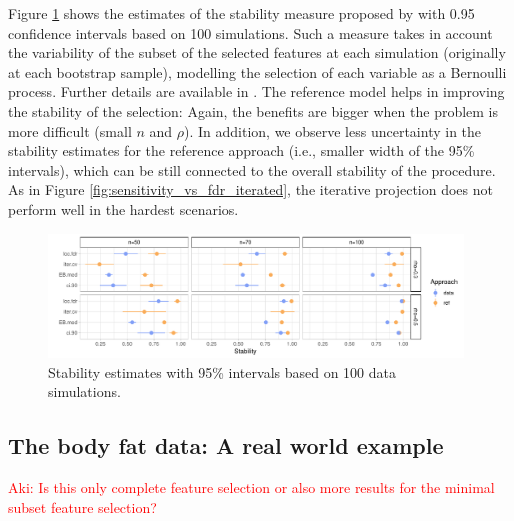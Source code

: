 \documentclass[american,]{article}
\theoremstyle{definition}
\newcommand{\note}[1]{\textcolor{red}{#1}}
\begin{document}

Figure \ref{fig:stability_iterated} shows the estimates of the stability
measure proposed by \cite{paper:stability} with 0.95 confidence
intervals based on 100 simulations. Such a measure takes in account
the variability of the subset of the selected features at each
simulation (originally at each bootstrap sample), modelling the
selection of each variable as a Bernoulli process. Further details are
available in \cite{paper:stability}. The reference model helps in
improving the stability of the selection: Again, the benefits are
bigger when the problem is more difficult (small $n$ and $\rho$). In
addition, we observe less uncertainty in the stability estimates for
the reference approach (i.e., smaller width of the 95\% intervals),
which can be still connected to the overall stability of the
procedure. As in Figure \ref{fig:sensitivity_vs_fdr_iterated}, the iterative
projection does not perform well in the hardest scenarios. 

\begin{figure}[tp]
  \centering
  \includegraphics[width=0.98\textwidth]{graphics/stability_iterated.pdf}
  \caption{Stability estimates with 95\% intervals based on 100 data simulations.\\}
  \label{fig:stability_iterated}
\end{figure}


\hypertarget{real-world-data}{%
\subsection{The body fat data: A real world example}\label{real-world-data}}

\note{Aki: Is this only complete feature selection or also more results for the minimal subset feature selection?}
\end{document}
